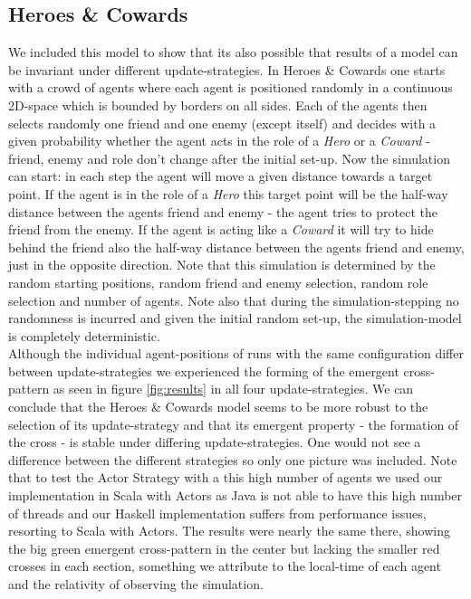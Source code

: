 \subsection{Heroes \& Cowards}
We included this model to show that its also possible that results of a model can be invariant under different update-strategies. In Heroes \& Cowards one starts with a crowd of agents where each agent is positioned randomly in a continuous 2D-space which is bounded by borders on all sides. Each of the agents then selects randomly one friend and one enemy (except itself) and decides with a given probability whether the agent acts in the role of a \textit{Hero} or a \textit{Coward} - friend, enemy and role don't change after the initial set-up. Now the simulation can start: in each step the agent will move a given distance towards a target point. If the agent is in the role of a \textit{Hero} this target point will be the half-way distance between the agents friend and enemy - the agent tries to protect the friend from the enemy. If the agent is acting like a \textit{Coward} it will try to hide behind the friend also the half-way distance between the agents friend and enemy, just in the opposite direction. Note that this simulation is determined by the random starting positions, random friend and enemy selection, random role selection and number of agents. Note also that during the simulation-stepping no randomness is incurred and given the initial random set-up, the simulation-model is completely deterministic. \\

Although the individual agent-positions of runs with the same configuration differ between update-strategies we experienced the forming of the emergent cross-pattern as seen in figure \ref{fig:results} in all four update-strategies. We can conclude that the Heroes \& Cowards model seems to be more robust to the selection of its update-strategy and that its emergent property - the formation of the cross - is stable under differing update-strategies. One would not see a difference between the different strategies so only one picture was included. Note that to test the Actor Strategy with a this high number of agents we used our implementation in Scala with Actors as Java is not able to have this high number of threads and our Haskell implementation suffers from performance issues, resorting to Scala with Actors. The results were nearly the same there, showing the big green emergent cross-pattern in the center but lacking the smaller red crosses in each section, something we attribute to the local-time of each agent and the relativity of observing the simulation.